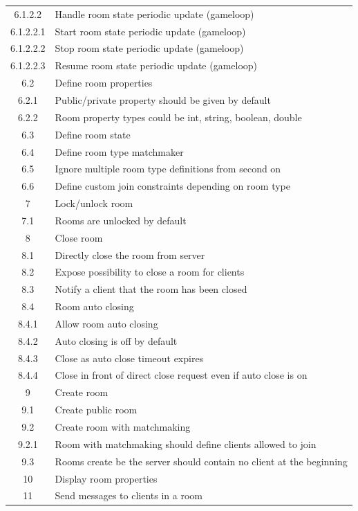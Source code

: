 \begin{center}
\begin{longtable}{|c|l|}
6.1.2.2   & Handle room state periodic update (gameloop)  \\ 
6.1.2.2.1 & Start room state periodic update (gameloop) \\
6.1.2.2.2 & Stop room state periodic update (gameloop) \\
6.1.2.2.3 & Resume room state periodic update (gameloop) \\
6.2       & Define room properties\\
6.2.1     & Public/private property should be given by default \\
6.2.2     & Room property types could be int, string, boolean, double \\ 
6.3       & Define room state \\
6.4       & Define room type matchmaker \\
6.5       & Ignore multiple room type definitions from second on \\
6.6       & Define custom join constraints depending on room type \\
7         & Lock/unlock room \\
7.1       & Rooms are unlocked by default \\
8         & Close room \\
8.1       & Directly close the room from server \\
8.2       & Expose possibility to close a room for clients \\
8.3       & Notify a client that the room has been closed \\
8.4       & Room auto closing \\
8.4.1     & Allow room auto closing \\
8.4.2     & Auto closing is off by default \\
8.4.3     & Close as auto close timeout expires \\
8.4.4     & Close in front of direct close request even if auto close is on \\
9         & Create room \\
9.1       & Create public room \\
9.2       & Create room with matchmaking \\
9.2.1     & Room with matchmaking should define clients allowed to join \\
9.3       & Rooms create be the server should contain no client at the beginning \\
10        & Display room properties \\
11        & Send messages to clients in a room \\

\end{longtable}
\end{center}
